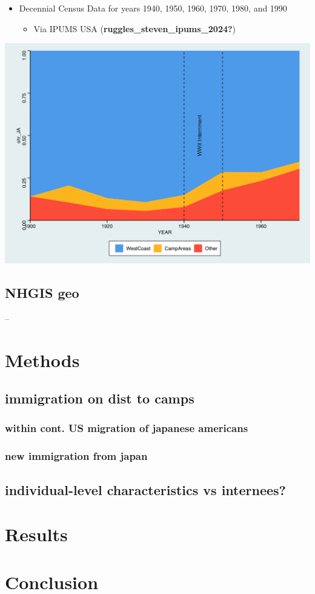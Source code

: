 \documentclass[
]{article}
\providecommand{\tightlist}{%
  \setlength{\itemsep}{0pt}\setlength{\parskip}{0pt}}\usepackage{longtable,booktabs,array}
\begin{document}
\begin{itemize}
\tightlist
\item
  Decennial Census Data for years 1940, 1950, 1960, 1970, 1980, and 1990

  \begin{itemize}
  \tightlist
  \item
    Via IPUMS USA (\textbf{ruggles\_steven\_ipums\_2024?})
  \end{itemize}
\end{itemize}

\includegraphics{figures/shareareaplot.png}

\subsection{NHGIS geo}\label{nhgis-geo}

--

\section{Methods}\label{methods}

\subsection{immigration on dist to
camps}\label{immigration-on-dist-to-camps}

\subsubsection{within cont. US migration of japanese
americans}\label{within-cont.-us-migration-of-japanese-americans}

\subsubsection{new immigration from
japan}\label{new-immigration-from-japan}

\subsection{individual-level characteristics vs
internees?}\label{individual-level-characteristics-vs-internees}

\section{Results}\label{results}

\section{Conclusion}\label{conclusion}
\end{document}
